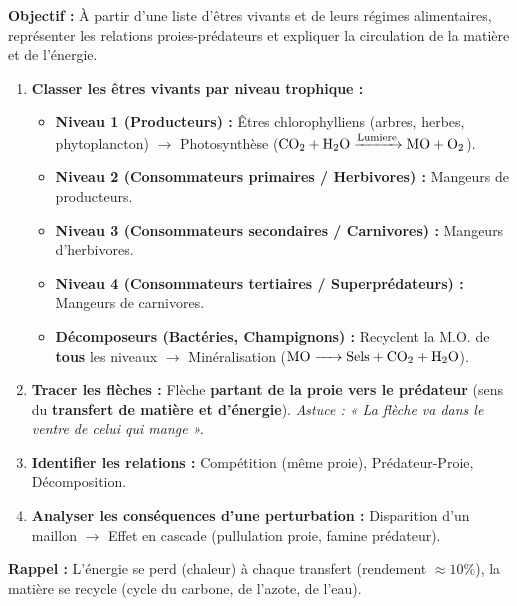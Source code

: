 \documentclass[11pt]{article}
\begin{document}
\begin{methode}
    \textbf{Objectif :} À partir d'une liste d'êtres vivants et de leurs régimes alimentaires, représenter les relations proies-prédateurs et expliquer la circulation de la matière et de l'énergie.
    \begin{enumerate}
        \item \textbf{Classer les êtres vivants par niveau trophique :}
              \begin{itemize}
                  \item \textbf{Niveau 1 (Producteurs) :} Êtres chlorophylliens (arbres, herbes, phytoplancton) $\rightarrow$ Photosynthèse ($\ce{CO2 + H2O ->[Lumiere] MO + O2}$).
                  \item \textbf{Niveau 2 (Consommateurs primaires / Herbivores) :} Mangeurs de producteurs.
                  \item \textbf{Niveau 3 (Consommateurs secondaires / Carnivores) :} Mangeurs d'herbivores.
                  \item \textbf{Niveau 4 (Consommateurs tertiaires / Superprédateurs) :} Mangeurs de carnivores.
                  \item \textbf{Décomposeurs (Bactéries, Champignons) :} Recyclent la M.O. de \textbf{tous} les niveaux $\rightarrow$ Minéralisation ($\ce{MO -> Sels + CO2 + H2O}$).
              \end{itemize}
        \item \textbf{Tracer les flèches :} Flèche \textbf{partant de la proie vers le prédateur} (sens du \textbf{transfert de matière et d'énergie}). \textit{Astuce : « La flèche va dans le ventre de celui qui mange ».}
        \item \textbf{Identifier les relations :} Compétition (même proie), Prédateur-Proie, Décomposition.
        \item \textbf{Analyser les conséquences d'une perturbation :} Disparition d'un maillon $\rightarrow$ Effet en cascade (pullulation proie, famine prédateur).
    \end{enumerate}
    \textbf{Rappel :} L'énergie se perd (chaleur) à chaque transfert (rendement $\approx 10\%$), la matière se recycle (cycle du carbone, de l'azote, de l'eau).
\end{methode}
\end{document}
